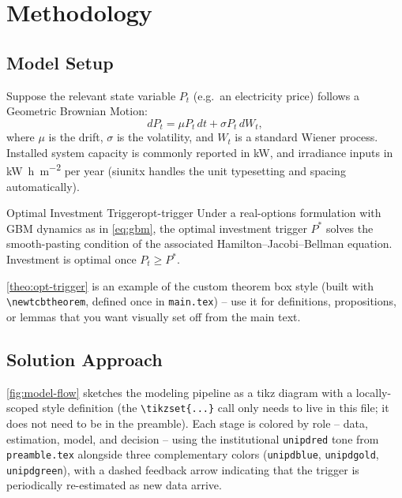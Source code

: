 \chapter{Methodology}
\label{chap:methodology}


\section{Model Setup}
\label{sec:methodology-model}

Suppose the relevant state variable $P_t$ (e.g.\ an electricity price) follows a Geometric Brownian Motion:
\begin{equation}
  \label{eq:gbm}
  dP_t = \mu P_t\, dt + \sigma P_t\, dW_t,
\end{equation}
where $\mu$ is the drift, $\sigma$ is the volatility, and $W_t$ is a standard Wiener process. Installed system capacity is commonly reported in \si{\kilo\watt}, and irradiance inputs in \si{\kilo\watt\hour\per\meter\squared} per year (siunitx handles the unit typesetting and spacing automatically).

\begin{theo}{Optimal Investment Trigger}{opt-trigger}
\label{theo:opt-trigger}
Under a real-options formulation with GBM dynamics as in \cref{eq:gbm}, the optimal investment trigger $P^{*}$ solves the smooth-pasting condition of the associated Hamilton--Jacobi--Bellman equation. Investment is optimal once $P_t \geq P^{*}$.
\end{theo}

\cref{theo:opt-trigger} is an example of the custom theorem box style (built with \texttt{\textbackslash newtcbtheorem}, defined once in \texttt{main.tex}) -- use it for definitions, propositions, or lemmas that you want visually set off from the main text.

\section{Solution Approach}

\cref{fig:model-flow} sketches the modeling pipeline as a tikz diagram with a locally-scoped style definition (the \texttt{\textbackslash tikzset\{...\}} call only needs to live in this file; it does not need to be in the preamble). Each stage is colored by role -- data, estimation, model, and decision -- using the institutional \texttt{unipdred} tone from \texttt{preamble.tex} alongside three complementary colors (\texttt{unipdblue}, \texttt{unipdgold}, \texttt{unipdgreen}), with a dashed feedback arrow indicating that the trigger is periodically re-estimated as new data arrive.

